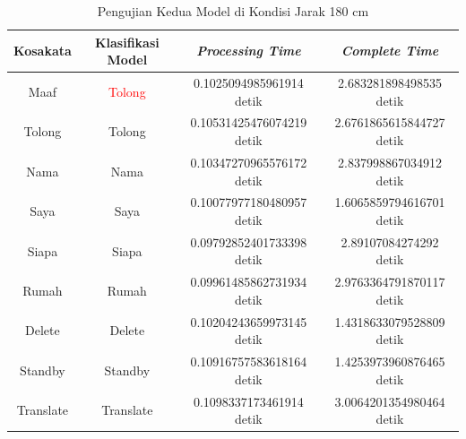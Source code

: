 \begin{longtable}{|c|c|c|c|}
  \caption{Pengujian Kedua Model di Kondisi Jarak 180 cm}
  \label{tb:prediksipendek2}                                   \\
  \hline
  \rowcolor[HTML]{C0C0C0}
  \textbf{Kosakata} & \textbf{Klasifikasi Model} & \textbf{\emph{Processing Time}} & \textbf{\emph{Complete Time}}\\
  \hline
  Maaf              & \textcolor{red}{Tolong}       & 0.1025094985961914  detik                           & 2.683281898498535  detik                                 \\
  Tolong            & Tolong                        & 0.10531425476074219 detik                           & 2.6761865615844727 detik                                  \\
  Nama              & Nama                          & 0.10347270965576172 detik                           & 2.837998867034912  detik                                 \\
  Saya              & Saya                          & 0.10077977180480957 detik                           & 1.6065859794616701 detik                                  \\
  Siapa              & Siapa                        & 0.09792852401733398 detik                           & 2.89107084274292   detik                                \\
  Rumah             & Rumah                         & 0.09961485862731934 detik                           & 2.9763364791870117 detik                                  \\
  Delete            & Delete                        & 0.10204243659973145 detik                           & 1.4318633079528809 detik                                  \\
  Standby           & Standby                       & 0.10916757583618164 detik                           & 1.4253973960876465 detik                                  \\
  Translate         & Translate                     & 0.1098337173461914  detik                           & 3.0064201354980464 detik                                  \\
  \hline
\end{longtable}

